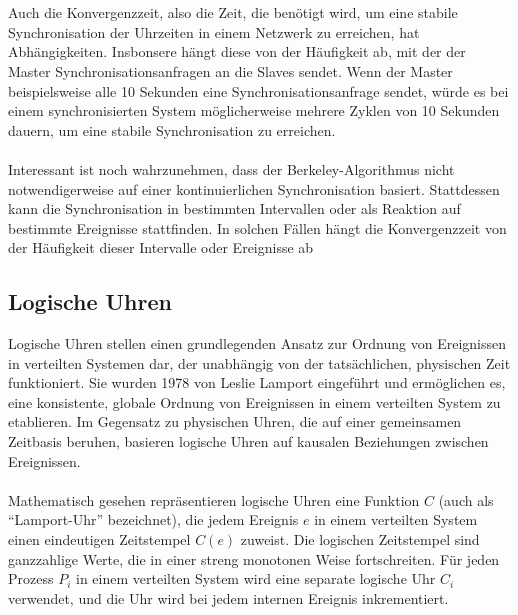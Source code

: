 \documentclass[../vs-script-first-v01.tex]{subfiles}
\begin{document}
\\\\
Auch die Konvergenzzeit, also die Zeit, die benötigt wird, um eine stabile Synchronisation der Uhrzeiten in einem Netzwerk zu erreichen, hat Abhängigkeiten.  Insbonsere hängt diese von der Häufigkeit ab, mit der der Master Synchronisationsanfragen an die Slaves sendet. Wenn der Master beispielsweise alle 10 Sekunden eine Synchronisationsanfrage sendet, würde es bei einem synchronisierten System möglicherweise mehrere Zyklen von 10 Sekunden dauern, um eine stabile Synchronisation zu erreichen. 
\\\\
Interessant ist noch wahrzunehmen, dass der Berkeley-Algorithmus nicht notwendigerweise auf einer kontinuierlichen Synchronisation basiert. Stattdessen kann die Synchronisation in bestimmten Intervallen oder als Reaktion auf bestimmte Ereignisse stattfinden. In solchen Fällen hängt die Konvergenzzeit von der Häufigkeit dieser Intervalle oder Ereignisse ab

\subsection{Logische Uhren}
Logische Uhren stellen einen grundlegenden Ansatz zur Ordnung von Ereignissen in verteilten Systemen dar, der unabhängig von der tatsächlichen, physischen Zeit funktioniert. Sie wurden 1978 von Leslie Lamport eingeführt und ermöglichen es, eine konsistente, globale Ordnung von Ereignissen in einem verteilten System zu etablieren. Im Gegensatz zu physischen Uhren, die auf einer gemeinsamen Zeitbasis beruhen, basieren logische Uhren auf kausalen Beziehungen zwischen Ereignissen.
\\\\
Mathematisch gesehen repräsentieren logische Uhren eine Funktion $C$ (auch als \enquote{Lamport-Uhr} bezeichnet), die jedem Ereignis $e$ in einem verteilten System einen eindeutigen Zeitstempel $C(e)$ zuweist. Die logischen Zeitstempel sind ganzzahlige Werte, die in einer streng monotonen Weise fortschreiten. Für jeden Prozess $P_i$ in einem verteilten System wird eine separate logische Uhr $C_i$ verwendet, und die Uhr wird bei jedem internen Ereignis inkrementiert.
\end{document}
